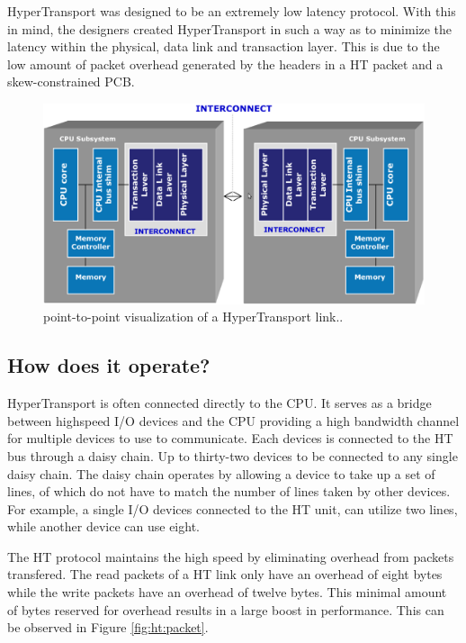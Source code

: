 \documentclass[conference]{IEEEtran}
\begin{document}
HyperTransport was designed to be an extremely low latency protocol. With this
in mind, the designers created HyperTransport in such a way as to minimize the
latency within the physical, data link and transaction layer. This is due to
the low amount of packet overhead generated by the headers in a HT packet and a
skew-constrained PCB.

\begin{figure}[!t]
	\begin{center}
		\includegraphics[scale=.15]{htDiagram}
	\end{center}
	\caption{point-to-point visualization of a
	HyperTransport link.\cite{holden2006latency}.}
	\label{fig:ht:diagram}
\end{figure}

\subsection{How does it operate?}
\label{subsec:ht:oper}


HyperTransport is often connected directly to the CPU. It serves as a bridge
between highspeed I/O devices and the CPU providing a high bandwidth channel for
multiple devices to use to communicate. Each devices is connected to the HT bus
through a daisy chain. Up to thirty-two devices to be connected to any single
daisy chain. The daisy chain operates by allowing a device to take up a set of lines,
of which do not have to match the number of lines taken by other devices. For
example, a single I/O devices connected to the HT unit, can utilize two lines,
while another device can use eight. 

The HT protocol maintains the high speed by eliminating overhead from packets
transfered. The read packets of a HT link only have an overhead of eight bytes
while the write packets have an overhead of twelve bytes. This minimal amount of
bytes reserved for overhead results in a large boost in performance. This can be
observed in Figure \ref{fig:ht:packet}.
\end{document}
